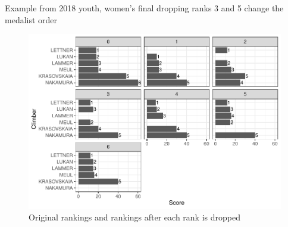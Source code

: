 \documentclass[12pt]{article}
\begin{document}
Example from 2018 youth, women's final dropping ranks 3 and 5 change the
medalist order

\begin{figure}
\centering
\includegraphics{draft_files/figure-latex/unnamed-chunk-11-1.pdf}
\caption{Original rankings and rankings after each rank is dropped}
\end{figure}



\end{document}
